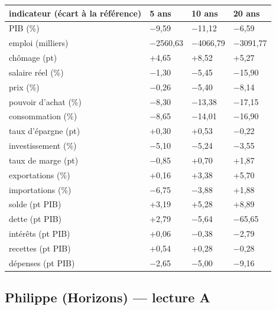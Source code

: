 \documentclass[
  11pt,
  11pt,
  a4paper,
  openany]{book}
\begin{document}
\begin{longtable}[]{@{}llll@{}}
\toprule\noalign{}
indicateur (écart à la référence) & 5 ans & 10 ans & 20 ans \\
\midrule\noalign{}
\endhead
\bottomrule\noalign{}
\endlastfoot
PIB (\%) & −9,59 & −11,12 & −6,59 \\
emploi (milliers) & −2560,63 & −4066,79 & −3091,77 \\
chômage (pt) & +4,65 & +8,52 & +5,27 \\
salaire réel (\%) & −1,30 & −5,45 & −15,90 \\
prix (\%) & −0,26 & −5,40 & −8,14 \\
pouvoir d'achat (\%) & −8,30 & −13,38 & −17,15 \\
consommation (\%) & −8,65 & −14,01 & −16,90 \\
taux d'épargne (pt) & +0,30 & +0,53 & −0,22 \\
investissement (\%) & −5,10 & −5,24 & −3,55 \\
taux de marge (pt) & −0,85 & +0,70 & +1,87 \\
exportations (\%) & +0,16 & +3,38 & +5,70 \\
importations (\%) & −6,75 & −3,88 & +1,88 \\
solde (pt PIB) & +3,19 & +5,28 & +8,89 \\
dette (pt PIB) & +2,79 & −5,64 & −65,65 \\
intérêts (pt PIB) & +0,06 & −0,38 & −2,79 \\
recettes (pt PIB) & +0,54 & +0,28 & −0,28 \\
dépenses (pt PIB) & −2,65 & −5,00 & −9,16 \\
\end{longtable}

\hypertarget{philippe-horizons-lecture-a}{%
\subsection{Philippe (Horizons) --- lecture
A}\label{philippe-horizons-lecture-a}}
\end{document}
